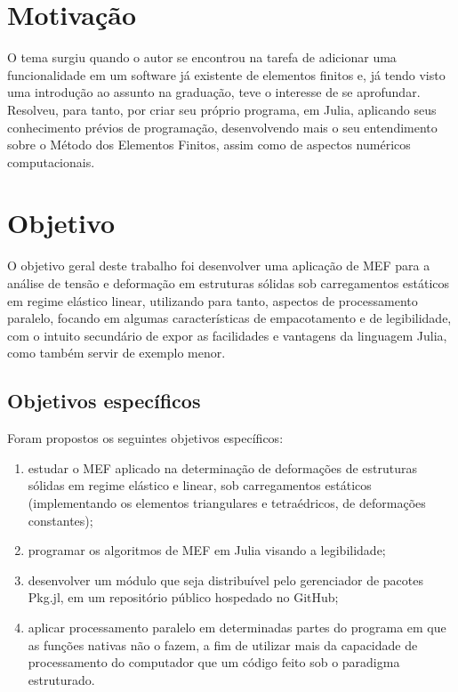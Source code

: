 \section{Motivação}

O tema surgiu quando o autor se encontrou na tarefa de adicionar uma funcionalidade em um software já existente de elementos finitos e, já tendo visto uma introdução ao assunto na graduação, teve o interesse de se aprofundar. Resolveu, para tanto, por criar seu próprio programa, em Julia, aplicando seus conhecimento prévios de programação, desenvolvendo mais o seu entendimento sobre o Método dos Elementos Finitos, assim como de aspectos numéricos computacionais.


\section{Objetivo}

O objetivo geral deste trabalho foi desenvolver uma aplicação de MEF para a análise de tensão e deformação em estruturas sólidas sob carregamentos estáticos em regime elástico linear, utilizando para tanto, aspectos de processamento paralelo, focando em algumas características de empacotamento e de legibilidade, com o intuito secundário de expor as facilidades e vantagens da linguagem Julia, como também servir de exemplo menor.

\subsection{Objetivos específicos}

Foram propostos os seguintes objetivos específicos:

\begin{enumerate}
    \item estudar o MEF aplicado na determinação de deformações de estruturas sólidas em regime elástico e linear, sob carregamentos estáticos (implementando os elementos triangulares e tetraédricos, de deformações constantes);
    \item programar os algoritmos de MEF em Julia visando a legibilidade;
    \item desenvolver um módulo que seja distribuível pelo gerenciador de pacotes Pkg.jl, em um repositório público hospedado no GitHub;
    \item aplicar processamento paralelo em determinadas partes do programa em que as funções nativas não o fazem, a fim de utilizar mais da capacidade de processamento do computador que um código feito sob o paradigma estruturado.
\end{enumerate}

